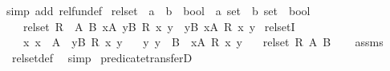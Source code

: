\begin{isabellebody}
%
\isadelimproof
%
\endisadelimproof
%
\isatagproof
{}\isamarkupfalse%
{\isacharparenleft}{\kern0pt}simp\ add{\isacharcolon}{\kern0pt}\ rel{\isacharunderscore}{\kern0pt}fun{\isacharunderscore}{\kern0pt}def{\isacharparenright}{\kern0pt}%
\endisatagproof
{\isafoldproof}%
%
\isadelimproof
\isanewline
%
\endisadelimproof
\isanewline
{}\isamarkupfalse%
\ rel{\isacharunderscore}{\kern0pt}set\ {\isacharcolon}{\kern0pt}{\isacharcolon}{\kern0pt}\ {\isachardoublequoteopen}{\isacharparenleft}{\kern0pt}{\isacharprime}{\kern0pt}a\ {\isasymRightarrow}\ {\isacharprime}{\kern0pt}b\ {\isasymRightarrow}\ bool{\isacharparenright}{\kern0pt}\ {\isasymRightarrow}\ {\isacharprime}{\kern0pt}a\ set\ {\isasymRightarrow}\ {\isacharprime}{\kern0pt}b\ set\ {\isasymRightarrow}\ bool{\isachardoublequoteclose}\isanewline
\ \ \ {\isachardoublequoteopen}rel{\isacharunderscore}{\kern0pt}set\ R\ {\isacharequal}{\kern0pt}\ {\isacharparenleft}{\kern0pt}{\isasymlambda}A\ B{\isachardot}{\kern0pt}\ {\isacharparenleft}{\kern0pt}{\isasymforall}x{\isasymin}A{\isachardot}{\kern0pt}\ {\isasymexists}y{\isasymin}B{\isachardot}{\kern0pt}\ R\ x\ y{\isacharparenright}{\kern0pt}\ {\isasymand}\ {\isacharparenleft}{\kern0pt}{\isasymforall}y{\isasymin}B{\isachardot}{\kern0pt}\ {\isasymexists}x{\isasymin}A{\isachardot}{\kern0pt}\ R\ x\ y{\isacharparenright}{\kern0pt}{\isacharparenright}{\kern0pt}{\isachardoublequoteclose}\isanewline
\isanewline
{}\isamarkupfalse%
\ rel{\isacharunderscore}{\kern0pt}setI{\isacharcolon}{\kern0pt}\isanewline
\ \ \ {\isachardoublequoteopen}{\isasymAnd}x{\isachardot}{\kern0pt}\ x\ {\isasymin}\ A\ {\isasymLongrightarrow}\ {\isasymexists}y{\isasymin}B{\isachardot}{\kern0pt}\ R\ x\ y{\isachardoublequoteclose}\isanewline
\ \ \ {\isachardoublequoteopen}{\isasymAnd}y{\isachardot}{\kern0pt}\ y\ {\isasymin}\ B\ {\isasymLongrightarrow}\ {\isasymexists}x{\isasymin}A{\isachardot}{\kern0pt}\ R\ x\ y{\isachardoublequoteclose}\isanewline
\ \ \ {\isachardoublequoteopen}rel{\isacharunderscore}{\kern0pt}set\ R\ A\ B{\isachardoublequoteclose}\isanewline
%
\isadelimproof
\ \ %
\endisadelimproof
%
\isatagproof
{}\isamarkupfalse%
\ assms\ \isamarkupfalse%
\ rel{\isacharunderscore}{\kern0pt}set{\isacharunderscore}{\kern0pt}def\ \isamarkupfalse%
\ simp%
\endisatagproof
{\isafoldproof}%
%
\isadelimproof
\isanewline
%
\endisadelimproof
\isanewline
{}\isamarkupfalse%
\ predicate{}{\isacharunderscore}{\kern0pt}transferD{\isacharcolon}{\kern0pt}\isanewline

\end{isabellebody}
